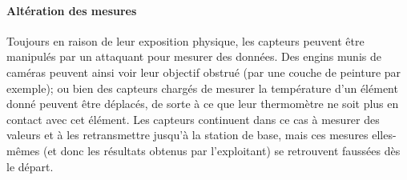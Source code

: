         \paragraph{Altération des mesures}
Toujours en raison de leur exposition physique, les capteurs peuvent être manipulés par un attaquant pour mesurer des données.
Des engins munis de caméras peuvent ainsi voir leur objectif obstrué (par une couche de peinture par exemple); ou bien des capteurs chargés de mesurer la température d'un élément donné peuvent être déplacés, de sorte à ce que leur thermomètre ne soit plus en contact avec cet élément.
Les capteurs continuent dans ce cas à mesurer des valeurs et à les retransmettre jusqu'à la station de base, mais ces mesures elles-mêmes (et donc les résultats obtenus par l'exploitant) se retrouvent faussées dès le départ.

